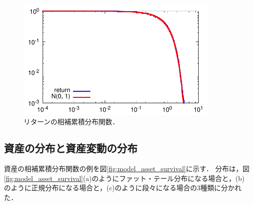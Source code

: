 \documentclass[titlepage]{jsreport}
\begin{document}
\begin{figure}
    \centering
    \includegraphics[width=10cm]{fig/return_survival.pdf}
    \caption{リターンの相補累積分布関数．}
    \label{fig:model_return}
\end{figure}

\subsection{資産の分布と資産変動の分布}\label{chap:model_asset}
資産の相補累積分布関数の例を図\ref{fig:model_asset_survival}に示す．
分布は，図\ref{fig:model_asset_survival}(a)のようにファット・テール分布になる場合と，(b)のように正規分布になる場合と，(c)のように段々になる場合の3種類に分かれた．
\end{document}
